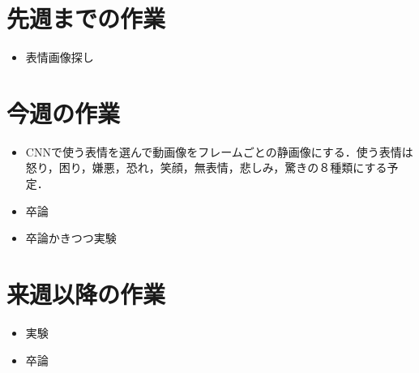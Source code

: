 \section{先週までの作業}
\begin{itemize}
\item 表情画像探し
\end{itemize}

\section{今週の作業}
\begin{itemize}
\item CNNで使う表情を選んで動画像をフレームごとの静画像にする．使う表情は怒り，困り，嫌悪，恐れ，笑顔，無表情，悲しみ，驚きの８種類にする予定．
\item 卒論
  \item 卒論かきつつ実験
\end{itemize}

\section{来週以降の作業}
\begin{itemize}
\item 実験
  \item 卒論
\end{itemize}


